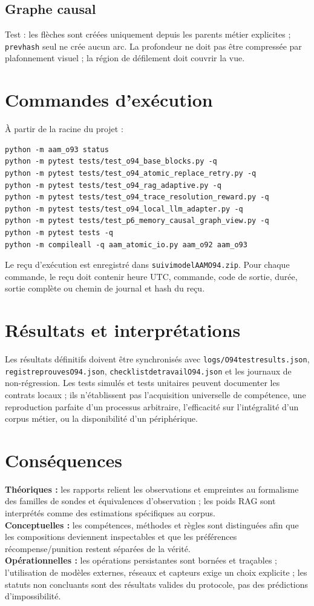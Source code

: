 \documentclass[11pt,a4paper]{article}
\begin{document}
\subsection{Graphe causal}
Test : les flèches sont créées uniquement depuis les parents métier explicites ; \texttt{prev\textunderscore hash} seul ne crée aucun arc. La profondeur ne doit pas être compressée par plafonnement visuel ; la région de défilement doit couvrir la vue.

\section{Commandes d'exécution}
À partir de la racine du projet :
\begin{verbatim}
python -m aam_o93 status
python -m pytest tests/test_o94_base_blocks.py -q
python -m pytest tests/test_o94_atomic_replace_retry.py -q
python -m pytest tests/test_o94_rag_adaptive.py -q
python -m pytest tests/test_o94_trace_resolution_reward.py -q
python -m pytest tests/test_o94_local_llm_adapter.py -q
python -m pytest tests/test_p6_memory_causal_graph_view.py -q
python -m pytest tests -q
python -m compileall -q aam_atomic_io.py aam_o92 aam_o93
\end{verbatim}
Le reçu d'exécution est enregistré dans \texttt{suivi\textunderscore model\textunderscore AAM\textunderscore O94.zip}. Pour chaque commande, le reçu doit contenir heure UTC, commande, code de sortie, durée, sortie complète ou chemin de journal et hash du reçu.

\section{Résultats et interprétations}
Les résultats définitifs doivent être synchronisés avec \texttt{logs/O94\textunderscore test\textunderscore results.json}, \texttt{registre\textunderscore prouves\textunderscore O94.json}, \texttt{checklist\textunderscore de\textunderscore travail\textunderscore O94.json} et les journaux de non-régression. Les tests simulés et tests unitaires peuvent documenter les contrats locaux ; ils n'établissent pas l'acquisition universelle de compétence, une reproduction parfaite d'un processus arbitraire, l'efficacité sur l'intégralité d'un corpus métier, ou la disponibilité d'un périphérique.

\section{Conséquences}
\textbf{Théoriques :} les rapports relient les observations et empreintes au formalisme des familles de sondes et équivalences d'observation ; les poids RAG sont interprétés comme des estimations spécifiques au corpus.\\
\textbf{Conceptuelles :} les compétences, méthodes et règles sont distinguées afin que les compositions deviennent inspectables et que les préférences récompense/punition restent séparées de la vérité.\\
\textbf{Opérationnelles :} les opérations persistantes sont bornées et traçables ; l'utilisation de modèles externes, réseaux et capteurs exige un choix explicite ; les statuts non concluants sont des résultats valides du protocole, pas des prédictions d'impossibilité.
\end{document}
